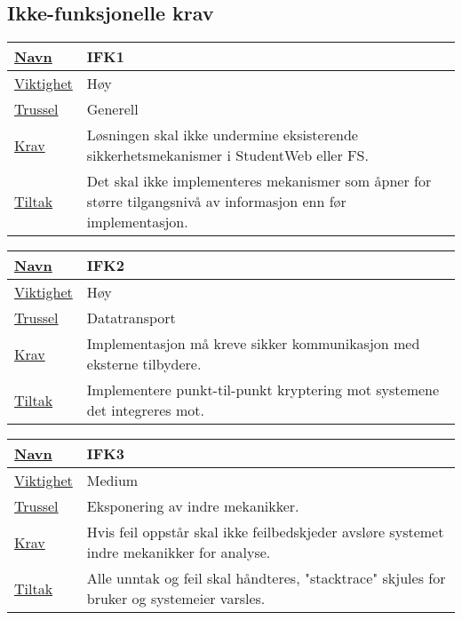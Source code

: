 \subsection{Ikke-funksjonelle krav}

\begin{tabularx}{\textwidth}{|l|X|}
  \hline
  \underline{Navn} & IFK1 \\ \hline
  \underline{Viktighet} & Høy \\ \hline
  \underline{Trussel} & Generell \\ \hline
  \underline{Krav} & Løsningen skal ikke undermine eksisterende sikkerhetsmekanismer i
  StudentWeb eller FS. \\ \hline
  \underline{Tiltak} & Det skal ikke implementeres mekanismer som åpner for større
  tilgangsnivå av informasjon enn før implementasjon. \\ \hline
\end{tabularx}

\vfill

\begin{tabularx}{\textwidth}{|l|X|}
  \hline
  \underline{Navn} & IFK2 \\ \hline
  \underline{Viktighet} & Høy \\ \hline
  \underline{Trussel} & Datatransport \\ \hline
  \underline{Krav} & Implementasjon må kreve sikker kommunikasjon med eksterne tilbydere. \\ \hline
  \underline{Tiltak} & Implementere punkt-til-punkt kryptering mot systemene det integreres
  mot. \\ \hline
\end{tabularx}

\vfill

\begin{tabularx}{\textwidth}{|l|X|}
  \hline
  \underline{Navn} & IFK3 \\ \hline
  \underline{Viktighet} & Medium \\ \hline
  \underline{Trussel} & Eksponering av indre mekanikker. \\ \hline
  \underline{Krav} & Hvis feil oppstår skal ikke feilbedskjeder avsløre systemet indre mekanikker for analyse. \\ \hline
  \underline{Tiltak} & Alle unntak og feil skal håndteres, "stacktrace" skjules for bruker og systemeier varsles. \\ \hline
\end{tabularx}

\vfill


